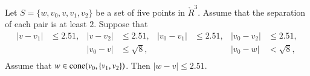


\newpage


\begin{lemma}
Let $S=\{w,v_0,v,v_1,v_2\}$ be a set of five points in $\ring{R}^3$.
Assume that the separation of each pair is at least $2$.%
Suppose that
  $$\begin{array}{rlrlrlrl}
    |v-v_1|&\le 2.51, &
    |v-v_2|&\le 2.51, &
    |v_0-v_1|&\le 2.51,&
    |v_0-v_2|&\le 2.51,\\
    && |v_0-v|&\le \sqrt8,&
    &&|v_0-w|&< \sqrt8,\\
  \end{array}
  $$
Assume that $w\in{\operatorname{cone}}(v_0,\{v_1,v_2\})$.
Then $|w-v|\le 2.51$.
\end{lemma}

